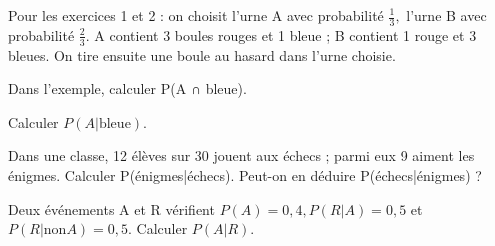 \documentclass[11pt]{article}
\begin{document}
Pour les exercices 1 et 2 : on choisit l’urne A avec probabilité \(\frac{1}{3},\) l’urne B avec probabilité \(\frac{2}{3}\). A contient 3 boules rouges et 1 bleue ; B contient 1 rouge et 3 bleues. On tire ensuite une boule au hasard dans l’urne choisie.\par
\vspace{5pt}
Dans l’exemple, calculer P(A ∩ bleue).\par
\vspace{5pt}
Calculer \(P(A|\mathrm{bleue})\).\par
\vspace{5pt}
Dans une classe, 12 élèves sur 30 jouent aux échecs ; parmi eux 9 aiment les énigmes. Calculer P(énigmes|échecs). Peut-on en déduire P(échecs|énigmes) ?\par
\vspace{5pt}
Deux événements A et R vérifient \(P(A)=0,4, P(R|A)=0,5\) et \(P(R|\mathrm{non} A)=0,5\). Calculer \(P(A|R)\).\par
\vspace{5pt}
\end{document}
